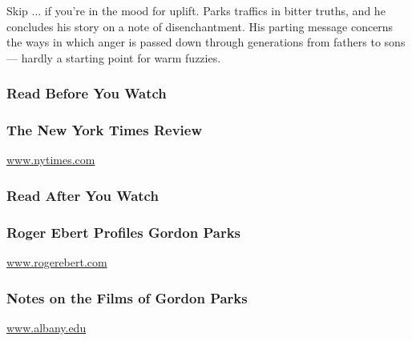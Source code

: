 Skip ... if you're in the mood for uplift. Parks traffics in bitter
truths, and he concludes his story on a note of disenchantment. His
parting message concerns the ways in which anger is passed down through
generations from fathers to sons --- hardly a starting point for warm
fuzzies.

\hypertarget{read-before-you-watch}{%
\subsubsection{Read Before You Watch}\label{read-before-you-watch}}

\href{http://www.nytimes.com/movie/review?res=9B07E7DB103AEF3BBC4F53DFBE668382679EDE}{}

\hypertarget{the-new-york-times-review}{%
\subsubsection{The New York Times
Review}\label{the-new-york-times-review}}

\href{http://www.nytimes.com}{www.nytimes.com}

\hypertarget{read-after-you-watch}{%
\subsubsection{Read After You Watch}\label{read-after-you-watch}}

\href{https://www.rogerebert.com/interviews/gordon-parks-big-score}{}

\hypertarget{roger-ebert-profiles-gordon-parks}{%
\subsubsection{Roger Ebert Profiles Gordon
Parks}\label{roger-ebert-profiles-gordon-parks}}

\href{http://www.rogerebert.com}{www.rogerebert.com}

\href{https://www.albany.edu/writers-inst/webpages4/filmnotes/fns99n3.html}{}

\hypertarget{notes-on-the-films-of-gordon-parks}{%
\subsubsection{Notes on the Films of Gordon
Parks}\label{notes-on-the-films-of-gordon-parks}}

\href{http://www.albany.edu}{www.albany.edu}

\href{https://www.nytimes.com/interactive/2018/02/01/movies/28-essential-films-black-history-month.html}{}

